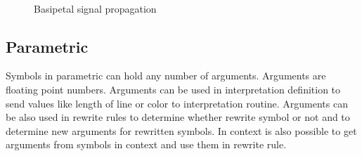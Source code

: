 \begin{figure}[ht]
	\centering
	 ~
	 ~
	 ~
	 ~
	\caption{Basipetal signal propagation}
	\label{fig:basipetalSignal}
\end{figure}


\subsection{Parametric \lsystems}

Symbols in parametric \lsystems can hold any number of arguments.
Arguments are floating point numbers.
Arguments can be used in interpretation definition to send values like length of line or color to interpretation routine.
Arguments can be also used in rewrite rules to determine whether rewrite symbol or not and to determine new arguments for rewritten symbols.
In context \twolsystems is also possible to get arguments from symbols in context and use them in rewrite rule.




































